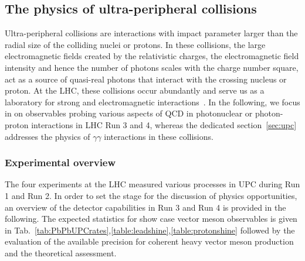 \documentclass[../report.tex]{subfiles}
\begin{document}
\subsection{The physics of ultra-peripheral collisions}
Ultra-peripheral collisions are interactions with impact parameter larger than the radial size of the colliding nuclei or protons. In these collisions, the large electromagnetic fields created by the relativistic charges, the electromagnetic field intensity and hence the number of photons scales with the charge number square, act as a source of quasi-real photons that interact with the crossing nucleus or proton. At the LHC, these collisions occur abundantly and serve us as a laboratory for strong and electromagnetic interactions~\cite{Baltz:2007kq}. In the following, we focus in on observables probing various aspects of QCD in photonuclear or photon-proton interactions in LHC Run 3 and 4, whereas the dedicated section~\ref{sec:upc} addresses the physics of $\gamma\gamma$ interactions in these collisions. 

\subsubsection{Experimental overview}
The four experiments at the LHC measured various processes in UPC during Run 1 and Run 2. In order to set the stage for the discussion of physics opportunities,  an overview of the detector capabilities in Run 3 and Run 4 is provided in the following. The expected statistics for show case vector meson observables is given in Tab.~\ref{tab:PbPbUPCrates},\ref{table:leadshine},\ref{table:protonshine} followed by the evaluation of the available precision for coherent heavy vector meson production and the theoretical assessment.
\end{document}
